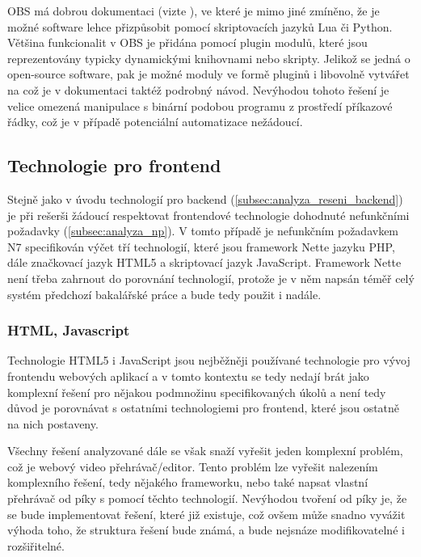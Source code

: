 \documentclass[thesis=M,czech]{FITthesis}[2012/06/26]
\begin{document}
	OBS má dobrou dokumentaci (vizte \cite{obs_doc}), ve které je mimo jiné zmíněno, že je možné software lehce přizpůsobit pomocí skriptovacích jazyků Lua či Python. Většina funkcionalit v OBS je přidána pomocí plugin modulů, které jsou reprezentovány typicky dynamickými knihovnami nebo skripty. Jelikož se jedná o open-source software, pak je možné moduly ve formě pluginů i libovolně vytvářet na což je v dokumentaci taktéž podrobný návod. Nevýhodou tohoto řešení je velice omezená manipulace s binární podobou programu z prostředí příkazové řádky, což je v případě potenciální automatizace nežádoucí.

\subsection{Technologie pro frontend} \label{subsec:analyza_reseni_frontend}
Stejně jako v úvodu technologií pro backend (\ref{subsec:analyza_reseni_backend}) je při rešerši žádoucí respektovat frontendové technologie dohodnuté nefunkčními požadavky (\ref{subsec:analyza_np}). V tomto případě je nefunkčním požadavkem N7 specifikován výčet tří technologií, které jsou framework Nette jazyku PHP, dále značkovací jazyk HTML5 a skriptovací jazyk JavaScript. Framework Nette není třeba zahrnout do porovnání technologií, protože je v něm napsán téměř celý systém předchozí bakalářské práce a bude tedy použit i nadále.


\subsubsection{HTML, Javascript} \label{subsubsec:analyza_reseni_html}
Technologie HTML5 i JavaScript jsou nejběžněji používané technologie pro vývoj frontendu webových aplikací a v tomto kontextu se tedy nedají brát jako komplexní řešení pro nějakou podmnožinu specifikovaných úkolů a není tedy důvod je porovnávat s ostatními technologiemi pro frontend, které jsou ostatně na nich postaveny. 
	
	Všechny řešení analyzované dále se však snaží vyřešit jeden komplexní problém, což je webový video přehrávač/editor. Tento problém lze vyřešit nalezením komplexního řešení, tedy nějakého frameworku, nebo také napsat vlastní přehrávač od píky s pomocí těchto technologií. Nevýhodou tvoření od píky je, že se bude implementovat řešení, které již existuje, což ovšem může snadno vyvážit výhoda toho, že struktura řešení bude známá, a bude nejsnáze modifikovatelné i rozšiřitelné.
	
\end{document}
